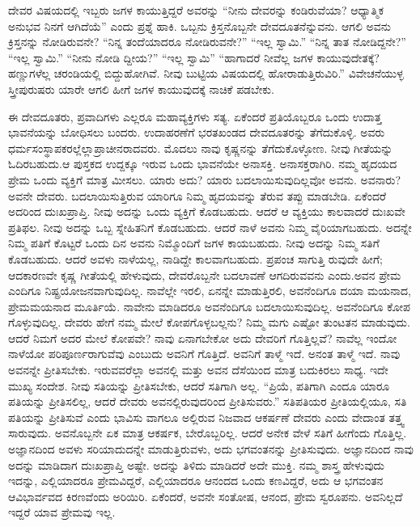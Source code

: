 ದೇವರ ವಿಷಯದಲ್ಲಿ ಇಬ್ಬರು ಜಗಳ ಕಾಯುತ್ತಿದ್ದರೆ ಅವರನ್ನು “ನೀನು ದೇವರನ್ನು ಕಂಡಿರುವೆಯಾ? ಆಧ್ಯಾತ್ಮಿಕ ಅನುಭವ ನಿನಗೆ ಆಗಿದೆಯೆ” ಎಂದು ಪ್ರಶ್ನೆ ಹಾಕಿ. ಒಬ್ಬನು ಕ್ರಿಸ್ತನೊಬ್ಬನೇ ದೇವದೂತನೆನ್ನುವನು. ಆಗಲಿ ಅವನು ಕ್ರಿಸ್ತನನ್ನು ನೋಡಿರುವನೇ? “ನಿನ್ನ ತಂದೆಯಾದರೂ ನೋಡಿರುವನೇ?” “ಇಲ್ಲ ಸ್ವಾಮಿ.” “ನಿನ್ನ ತಾತ ನೋಡಿದ್ದನೇ?” “ಇಲ್ಲ ಸ್ವಾಮಿ.” “ನೀನು ನೋಡಿ ದ್ದೀಯ?” “ಇಲ್ಲ ಸ್ವಾಮಿ” “ಹಾಗಾದರೆ ನೀವೆಲ್ಲ ಜಗಳ ಕಾಯುವುದೇತಕ್ಕೆ? ಹಣ್ಣುಗಳೆಲ್ಲ ಚರಂಡಿಯಲ್ಲಿ ಬಿದ್ದುಹೋಗಿವೆ. ನೀವು ಬುಟ್ಟಿಯ ವಿಷಯದಲ್ಲಿ ಹೋರಾಡುತ್ತಿರುವಿರಿ.” ವಿವೇಚನೆಯುಳ್ಳ ಸ್ತ್ರೀಪುರುಷರು ಯಾರೇ ಆಗಲಿ ಹೀಗೆ ಜಗಳ ಕಾಯುವುದಕ್ಕೆ ನಾಚಿಕೆ ಪಡಬೇಕು.

ಈ ದೇವದೂತರು, ಪ್ರವಾದಿಗಳು ಎಲ್ಲರೂ ಮಹಾವ್ಯಕ್ತಿಗಳು ಸತ್ಯ. ಏಕೆಂದರೆ ಪ್ರತಿಯೊಬ್ಬರೂ ಒಂದು ಉದಾತ್ತ ಭಾವನೆಯನ್ನು ಬೋಧಿಸಲು ಬಂದರು. ಉದಾಹರಣೆಗೆ ಭರತಖಂಡದ ದೇವದೂತರನ್ನು ತೆಗೆದುಕೊಳ್ಳಿ. ಅವರು ಧರ್ಮಸಂಸ್ಥಾಪಕರಲ್ಲೆಲ್ಲಾ\break ಪ್ರಾಚೀನರಾದವರು. ಮೊದಲು ನಾವು ಕೃಷ್ಣನನ್ನು ತೆಗೆದುಕೊಳ್ಳೋಣ. ನೀವು ಗೀತೆಯನ್ನು ಓದಿರಬಹುದು.ಆ ಪುಸ್ತಕದ ಉದ್ದಕ್ಕೂ ಇರುವ ಒಂದು ಭಾವನೆಯೇ ಅನಾಸಕ್ತಿ. ಅನಾಸಕ್ತರಾಗಿರಿ. ನಮ್ಮ ಹೃದಯದ ಪ್ರೇಮ ಒಂದು ವ್ಯಕ್ತಿಗೆ ಮಾತ್ರ ಮೀಸಲು. ಯಾರು ಅದು? ಯಾರು ಬದಲಾಯಿಸುವುದಿಲ್ಲವೋ ಅವನು. ಅವನಾರು? ಅವನೇ ದೇವರು. ಬದಲಾಯಿ\break ಸುತ್ತಿರುವ ಯಾರಿಗೂ ನಿಮ್ಮ ಹೃದಯವನ್ನು ತೆರುವ ತಪ್ಪು ಮಾಡಬೇಡಿ. ಏಕೆಂದರೆ ಅದರಿಂದ ದುಃಖಪ್ರಾಪ್ತಿ. ನೀವು ಅದನ್ನು ಒಂದು ವ್ಯಕ್ತಿಗೆ ಕೊಡಬಹುದು. ಆದರೆ ಆ ವ್ಯಕ್ತಿಯು ಕಾಲವಾದರೆ ದುಃಖವೇ ಪ್ರತಿಫಲ. ನೀವು ಅದನ್ನು ಒಬ್ಬ ಸ್ನೇಹಿತನಿಗೆ ಕೊಡಬಹುದು. ಆದರೆ ನಾಳೆ ಅವನು ನಿಮ್ಮ ವೈರಿಯಾಗಬಹುದು. ಅದನ್ನೇ ನಿಮ್ಮ ಪತಿಗೆ ಕೊಟ್ಟರೆ ಒಂದು ದಿನ ಅವನು ನಿಮ್ಮೊಂದಿಗೆ ಜಗಳ ಕಾಯಬಹುದು. ನೀವು ಅದನ್ನು ನಿಮ್ಮ ಸತಿಗೆ ಕೊಡಬಹುದು. ಆದರೆ ಅವಳು ನಾಳೆಯಲ್ಲ, ನಾಡಿದ್ದೇ ಕಾಲವಾಗಬಹುದು. ಪ್ರಪಂಚ ಸಾಗುತ್ತಿ ರುವುದೇ ಹೀಗೆ; ಆದಕಾರಣವೇ ಕೃಷ್ಣ ಗೀತೆಯಲ್ಲಿ ಹೇಳುವುದು, ದೇವರೊಬ್ಬನೇ ಬದಲಾವಣೆ ಆಗದಿರುವವನು ಎಂದು.ಅವನ ಪ್ರೇಮ ಎಂದಿಗೂ ನಿಷ್ಪ್ರಯೋಜನವಾಗುವುದಿಲ್ಲ. ನಾವೆಲ್ಲೇ ಇರಲಿ, ಏನನ್ನೇ ಮಾಡುತ್ತಿರಲಿ, ಅವನೆಂದಿಗೂ ದಯಾ ಮಯನಾದ, ಪ್ರೇಮಮಯನಾದ ಮೂರ್ತಿಯೆ. ನಾವೇನು ಮಾಡಿದರೂ ಅವನೆಂದಿಗೂ ಬದಲಾಯಿಸುವುದಿಲ್ಲ. ಅವನೆಂದಿಗೂ ಕೋಪ ಗೊಳ್ಳುವುದಿಲ್ಲ. ದೇವರು ಹೇಗೆ ನಮ್ಮ ಮೇಲೆ ಕೋಪಗೊಳ್ಳಬಲ್ಲನು? ನಿಮ್ಮ ಮಗು ಎಷ್ಟೋ ತುಂಟತನ ಮಾಡುವುದು. ಆದರೆ ನಿಮಗೆ ಅದರ ಮೇಲೆ ಕೋಪವೇ? ನಾವು ಏನಾಗಬೇಕೋ ಅದು ದೇವರಿಗೆ ಗೊತ್ತಿಲ್ಲವೆ? ನಾವೆಲ್ಲ ಇಂದೋ ನಾಳೆಯೋ ಪರಿಪೂರ್ಣರಾಗುವೆವು ಎಂಬುದು ಅವನಿಗೆ ಗೊತ್ತಿದೆ. ಅವನಿಗೆ ತಾಳ್ಮೆ ಇದೆ. ಅನಂತ ತಾಳ್ಮೆ ಇದೆ. ನಾವು ಅವನನ್ನೇ ಪ್ರೀತಿಸಬೇಕು. ಇರುವವರೆಲ್ಲಾ ಅವನಲ್ಲಿ ಮತ್ತು ಅವನ ದೆಸೆಯಿಂದ ಮಾತ್ರ ಬದುಕಿರಲು ಸಾಧ್ಯ. ಇದೇ ಮುಖ್ಯ ಸಂದೇಶ. ನೀವು ಸತಿಯನ್ನು ಪ್ರೀತಿಸಬೇಕು, ಆದರೆ ಸತಿಗಾಗಿ ಅಲ್ಲ. “ಪ್ರಿಯೆ, ಪತಿಗಾಗಿ ಎಂದೂ ಯಾರೂ ಪತಿಯನ್ನು ಪ್ರೀತಿಸಲಿಲ್ಲ, ಆದರೆ ದೇವರು ಅವನಲ್ಲಿರುವುದರಿಂದ ಪ್ರೀತಿಸುವರು.” ಸತಿಪತಿಯರ ಪ್ರೀತಿಯಲ್ಲಿಯೂ, ಸತಿ ಪತಿಯನ್ನು ಪ್ರೀತಿಸುವೆ ಎಂದು ಭಾವಿಸು ವಾಗಲೂ ಅಲ್ಲಿರುವ ನಿಜವಾದ ಆಕರ್ಷಣೆ ದೇವರು ಎಂದು ವೇದಾಂತ ತತ್ತ್ವ ಸಾರುವುದು. ಅವನೊಬ್ಬನೇ ಏಕ ಮಾತ್ರ ಆಕರ್ಷಕ, ಬೇರೊಬ್ಬರಿಲ್ಲ. ಆದರೆ ಅನೇಕ ವೇಳೆ ಸತಿಗೆ ಹೀಗೆಂದು ಗೊತ್ತಿಲ್ಲ. ಅಜ್ಞಾನದಿಂದ ಅವಳು ಸರಿಯಾದುದನ್ನೇ ಮಾಡುತ್ತಿರುವಳು, ಅದು ಭಗವಂತನನ್ನು ಪ್ರೀತಿಸುವುದು. ಅಜ್ಞಾನದಿಂದ ನಾವು ಅದನ್ನು ಮಾಡಿದಾಗ ದುಃಖಪ್ರಾಪ್ತಿ ಅಷ್ಟೇ. ಅದನ್ನು ತಿಳಿದು ಮಾಡಿದರೆ ಅದೇ ಮುಕ್ತಿ. ನಮ್ಮ ಶಾಸ್ತ್ರ ಹೇಳುವುದು ಇದನ್ನು, ಎಲ್ಲಿಯಾದರೂ ಪ್ರೇಮವಿದ್ದರೆ, ಎಲ್ಲಿಯಾದರೂ ಆನಂದದ ಒಂದು ಕಣವಿದ್ದರೆ, ಅದು ಆ ಭಗವಂತನ ಆವಿಭಾರ್ವವದ ಕಿರಣವೆಂದು ಅರಿಯಿರಿ. ಏಕೆಂದರೆ, ಅವನೇ ಸಂತೋಷ, ಆನಂದ, ಪ್ರೇಮ ಸ್ವರೂಪನು. ಅವನಿಲ್ಲದೆ ಇದ್ದರೆ ಯಾವ ಪ್ರೇಮವು ಇಲ್ಲ.

